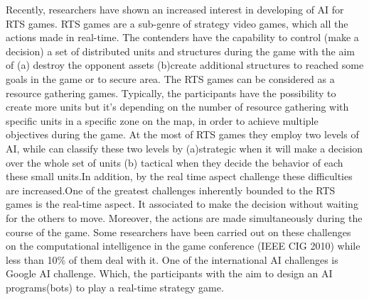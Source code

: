 \documentclass[conference]{IEEEtran}
\begin{document}
Recently, researchers have shown an increased interest in developing of AI for RTS games. RTS games are a sub-genre of strategy video games, which all the actions made in real-time. The contenders have the capability to control (make a decision) a set of distributed units and structures during the game with the aim of (a) destroy the opponent assets (b)create additional structures to reached some goals in the game or to secure area.\cite{doc5,doc1,doc2,doc3,doc4} The RTS games can be considered as a resource gathering games. Typically, the participants have the possibility to create more units but it's depending on the number of resource gathering with specific units in a specific zone on the map, in order to achieve multiple objectives during the game.\cite{doc5,doc2} At the most of RTS games they employ two levels of AI\cite{doc1}, while can classify these two levels by (a)strategic when it will make a decision over the whole set of units (b) tactical when they decide the behavior of each these small units.In addition, by the real time aspect challenge these difficulties are increased.One of the greatest challenges inherently bounded to the RTS games is the real-time aspect\cite{doc3}. It associated to make the decision without waiting for the others to move. Moreover, the actions are made simultaneously during the course of the game. Some researchers have been carried out on these challenges on the computational intelligence in the game conference (IEEE CIG 2010) while less than 10\% of them deal with it.\cite{doc1,doc3} One of the international AI challenges is Google AI challenge. Which, the participants with the aim to design an AI programs(bots) to play a real-time strategy game. \\
\end{document}
